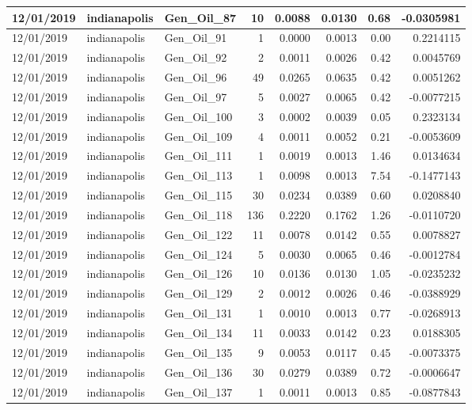\documentclass[
  letterpaper,
  DIV=11,
  numbers=noendperiod]{scrartcl}
\begin{document}
\begin{tabular}{l|l|l|r|r|r|r|r}
\hline
12/01/2019 & indianapolis & Gen\_Oil\_87 & 10 & 0.0088 & 0.0130 & 0.68 & -0.0305981\\
\hline
12/01/2019 & indianapolis & Gen\_Oil\_91 & 1 & 0.0000 & 0.0013 & 0.00 & 0.2214115\\
\hline
12/01/2019 & indianapolis & Gen\_Oil\_92 & 2 & 0.0011 & 0.0026 & 0.42 & 0.0045769\\
\hline
12/01/2019 & indianapolis & Gen\_Oil\_96 & 49 & 0.0265 & 0.0635 & 0.42 & 0.0051262\\
\hline
12/01/2019 & indianapolis & Gen\_Oil\_97 & 5 & 0.0027 & 0.0065 & 0.42 & -0.0077215\\
\hline
12/01/2019 & indianapolis & Gen\_Oil\_100 & 3 & 0.0002 & 0.0039 & 0.05 & 0.2323134\\
\hline
12/01/2019 & indianapolis & Gen\_Oil\_109 & 4 & 0.0011 & 0.0052 & 0.21 & -0.0053609\\
\hline
12/01/2019 & indianapolis & Gen\_Oil\_111 & 1 & 0.0019 & 0.0013 & 1.46 & 0.0134634\\
\hline
12/01/2019 & indianapolis & Gen\_Oil\_113 & 1 & 0.0098 & 0.0013 & 7.54 & -0.1477143\\
\hline
12/01/2019 & indianapolis & Gen\_Oil\_115 & 30 & 0.0234 & 0.0389 & 0.60 & 0.0208840\\
\hline
12/01/2019 & indianapolis & Gen\_Oil\_118 & 136 & 0.2220 & 0.1762 & 1.26 & -0.0110720\\
\hline
12/01/2019 & indianapolis & Gen\_Oil\_122 & 11 & 0.0078 & 0.0142 & 0.55 & 0.0078827\\
\hline
12/01/2019 & indianapolis & Gen\_Oil\_124 & 5 & 0.0030 & 0.0065 & 0.46 & -0.0012784\\
\hline
12/01/2019 & indianapolis & Gen\_Oil\_126 & 10 & 0.0136 & 0.0130 & 1.05 & -0.0235232\\
\hline
12/01/2019 & indianapolis & Gen\_Oil\_129 & 2 & 0.0012 & 0.0026 & 0.46 & -0.0388929\\
\hline
12/01/2019 & indianapolis & Gen\_Oil\_131 & 1 & 0.0010 & 0.0013 & 0.77 & -0.0268913\\
\hline
12/01/2019 & indianapolis & Gen\_Oil\_134 & 11 & 0.0033 & 0.0142 & 0.23 & 0.0188305\\
\hline
12/01/2019 & indianapolis & Gen\_Oil\_135 & 9 & 0.0053 & 0.0117 & 0.45 & -0.0073375\\
\hline
12/01/2019 & indianapolis & Gen\_Oil\_136 & 30 & 0.0279 & 0.0389 & 0.72 & -0.0006647\\
\hline
12/01/2019 & indianapolis & Gen\_Oil\_137 & 1 & 0.0011 & 0.0013 & 0.85 & -0.0877843\\

\end{tabular}
\end{document}
